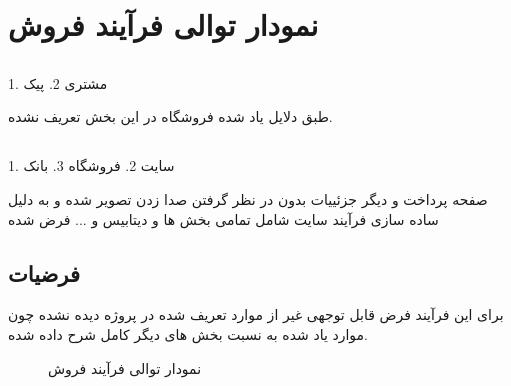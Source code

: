 \documentclass[12pt,onecolumn,a4paper]{article}
\begin{document}
\newpage
\tableofcontents
\newpage
\listoffigures
\newpage


\section{نمودار توالی فرآیند فروش}
\subsection{ }

1. مشتری
2. پیک

طبق دلایل یاد شده فروشگاه در این بخش تعریف نشده.
\subsection{ }
1. سایت
2. فروشگاه
3. بانک

صفحه پرداخت و دیگر جزئییات بدون در نظر گرفتن صدا زدن  تصویر شده و به دلیل ساده سازی فرآیند سایت شامل تمامی بخش ها و دیتابیس و ... فرض شده 

\subsection{فرضیات }
برای این فرآیند فرض قابل توجهی غیر از موارد تعریف شده در پروژه دیده نشده چون موارد یاد شده به نسبت بخش های دیگر کامل شرح داده شده. 

\newpage
\begin{figure}[!h]
\caption{نمودار توالی فرآیند فروش}\label{sellpng}
\end{figure}
\end{document}
